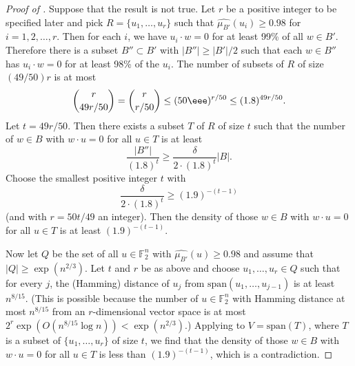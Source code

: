 \documentclass{toc}
\begin{document}
\begin{proof}[Proof of ]
  Suppose that the result is not true. Let $r$ be a positive integer
  to be specified later and pick $R=\{u_1,\dots,u_r\}$ such that
  $\widehat{\mu_{B'}}(u_i)\geq 0.98$ for $i=1,2,\dots,r$. Then for
  each $i$, we have $u_i\cdot w=0$ for at least 99\% of all $w\in
  B'$. Therefore there is a subset $B''\subset B'$ with
  $|B''|\geq |B'|/2$ such that each $w\in B''$ has $u_i\cdot w=0$ for
  at least 98\% of the $u_i$. The number of subsets of $R$ of size
  $({49}/{50})r$ is at most
  \[
    \binom{r}{49r/50}=\binom{r}{r/50}\leq (50\eee)^{r/50}\leq (1.8)^{49r/50}.
  \]
  Let $t=49r/50$. Then there exists a subset $T$ of $R$ of size $t$
  such that the number of $w\in B$ with $w\cdot u=0$ for all $u\in T$
  is at least
  \[
    \frac{|B''|}{(1.8)^t}\geq \frac{\delta}{2\cdot (1.8)^t}|B|.
  \]
  Choose the smallest positive integer $t$ with
  \[
    \frac{\delta}{2\cdot (1.8)^t}\geq (1.9)^{-(t-1)}
  \]
  (and with $r=50t/49$ an integer). Then the density of those $w\in B$
  with $w\cdot u=0$ for all $u\in T$ is at least $(1.9)^{-(t-1)}$.
	
	Now let $Q$ be the set of all $u\in \mathbb{F}_2^n$ with $\widehat{\mu_{B'}}(u)\geq 0.98$ and assume that $|Q|\geq \exp(n^{2/3})$. Let $t$ and $r$ be as above and choose $u_1,\dots,u_r\in Q$ such that for every $j$, the (Hamming) distance of $u_j$ from $\text{span}(u_1,\dots,u_{j-1})$ is at least $n^{8/15}$. (This is possible because the number of $u\in \mathbb{F}_2^n$ with Hamming distance at most $n^{8/15}$ from an $r$-dimensional vector space is at most $2^r \exp(O(n^{8/15}\log n))<\exp(n^{2/3})$.) Applying  to $V=\text{span}(T)$, where $T$ is a subset of $\{u_1,\dots,u_r\}$ of size $t$, we find that the density of those $w\in B$ with $w\cdot u=0$ for all $u\in T$ is less than $(1.9)^{-(t-1)}$, which is a contradiction. 
\end{proof}
\end{document}
